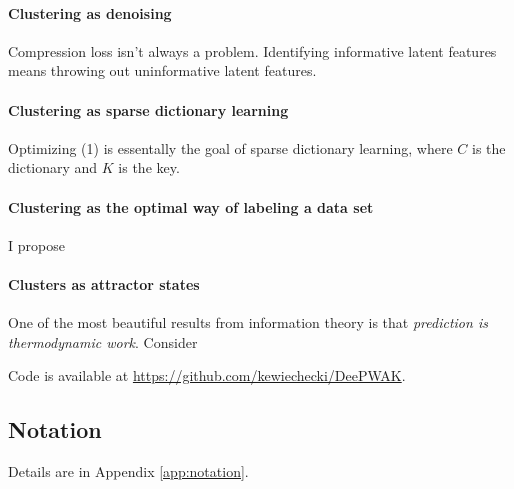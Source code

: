 \paragraph{Clustering as denoising}
Compression loss isn't always a problem.
Identifying informative latent features means throwing out uninformative latent features.

\paragraph{Clustering as sparse dictionary learning}
Optimizing (1) is essentally the goal of sparse dictionary learning, where
$C$ is the dictionary and $K$ is the key.

\paragraph{Clustering as the optimal way of labeling a data set}

I propose 

\paragraph{Clusters as attractor states}
One of the most beautiful results from information theory is that \textit{prediction is thermodynamic work}.
Consider 

Code is available at \url{https://github.com/kewiechecki/DeePWAK}.

\subsection{Notation}
Details are in Appendix \ref{app:notation}.



